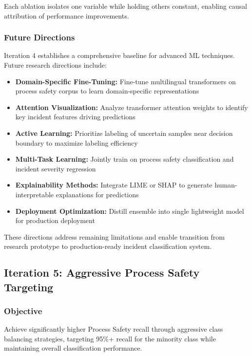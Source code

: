 \documentclass[11pt, titlepage, bibliography=totoc]{scrreprt}
\begin{document}
Each ablation isolates one variable while holding others constant, enabling causal attribution of performance improvements.

\subsubsection{Future Directions}

Iteration 4 establishes a comprehensive baseline for advanced ML techniques. Future research directions include:

\begin{itemize}
    \item \textbf{Domain-Specific Fine-Tuning:} Fine-tune multilingual transformers on process safety corpus to learn domain-specific representations
    \item \textbf{Attention Visualization:} Analyze transformer attention weights to identify key incident features driving predictions
    \item \textbf{Active Learning:} Prioritize labeling of uncertain samples near decision boundary to maximize labeling efficiency
    \item \textbf{Multi-Task Learning:} Jointly train on process safety classification and incident severity regression
    \item \textbf{Explainability Methods:} Integrate LIME or SHAP to generate human-interpretable explanations for predictions
    \item \textbf{Deployment Optimization:} Distill ensemble into single lightweight model for production deployment
\end{itemize}

These directions address remaining limitations and enable transition from research prototype to production-ready incident classification system.

\subsection{Iteration 5: Aggressive Process Safety Targeting}

\subsubsection{Objective}
Achieve significantly higher Process Safety recall through aggressive class balancing strategies, targeting 95\%+ recall for the minority class while maintaining overall classification performance.
\end{document}
